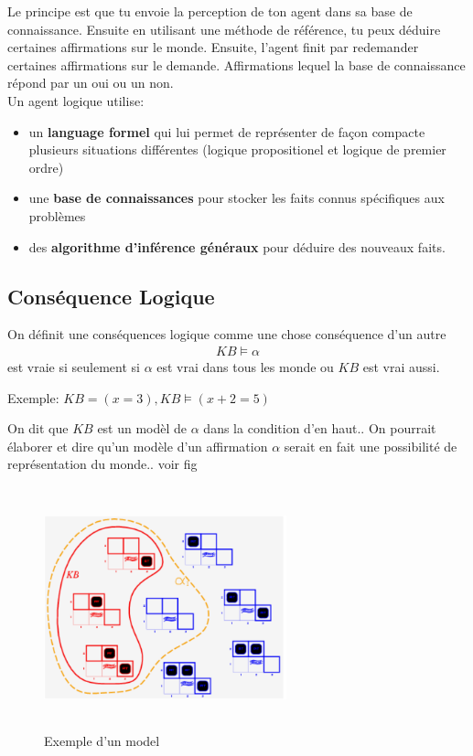 \documentclass[oneside]{book}
\begin{document}
Le principe est que tu envoie la perception de ton agent dans sa base de connaissance. Ensuite en utilisant une méthode de référence, tu peux déduire certaines affirmations sur le monde. Ensuite, l'agent finit par redemander certaines affirmations sur le demande. Affirmations lequel la base de connaissance répond par un oui ou un non.\\

\noindent Un agent logique utilise:
\begin{itemize}
\item un \textbf{language formel} qui lui permet de représenter de façon compacte plusieurs situations différentes (logique propositionel et logique de premier ordre)

\item une \textbf{base de connaissances} pour stocker les faits connus spécifiques aux problèmes

\item des \textbf{algorithme d'inférence généraux} pour déduire des nouveaux faits.
\end{itemize}

\subsection{Conséquence Logique}
On définit une conséquences logique comme une chose conséquence d'un autre
\begin{align*}
KB \models \alpha
\end{align*}
\noindent est vraie si seulement si $\alpha$ est vrai dans tous les monde ou $KB$ est vrai aussi.

\noindent Exemple: $ KB = ( x = 3 ), KB \models ( x + 2 = 5 )$

On dit que $KB$ est un modèl de $\alpha$ dans la condition d'en haut.. On pourrait élaborer et dire qu'un modèle d'un affirmation $\alpha$ serait en fait une possibilité de représentation du monde.. voir fig 

\begin{figure}[h!t]
\centering
\includegraphics[width = 7cm, height = 7cm, keepaspectratio]{exemple_model.png}
\caption{Exemple d'un model}
\label{fig:exemple_model}
\end{figure}
\end{document}
